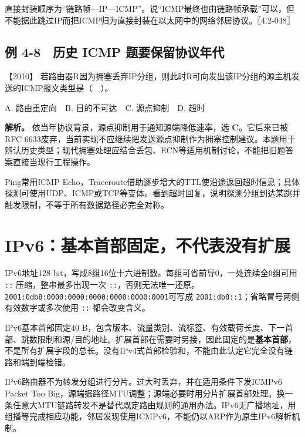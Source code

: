 直接封装顺序为``链路帧---IP---ICMP''。说``ICMP最终也由链路帧承载''可以，但不能据此跳过IP而把ICMP归为直接封装在以太网中的网络邻居协议。〖4.2-048〗

\subsection{例 4-8　历史 ICMP 题要保留协议年代}\label{cn-ex4-8}

\noindent{}【2010】 若路由器R因为拥塞丢弃IP分组，则此时R可向发出该IP分组的源主机发送的ICMP报文类型是（　）。

A. 路由重定向　B. 目的不可达　C. 源点抑制　D. 超时


\textbf{解析。} 依当年协议背景，源点抑制用于通知源端降低速率，选 \textbf{C}。它后来已被RFC 6633废弃，当前实现不应继续把发送源点抑制作为拥塞控制建议。本题用于辨认历史类型；现代拥塞处理应结合丢包、ECN等适用机制讨论，不能把旧题答案直接当现行工程操作。

Ping常用ICMP Echo，Traceroute借助逐步增大的TTL使沿途返回超时信息；具体探测可使用UDP、ICMP或TCP等变体。看到超时回复，说明探测分组到达某跳并触发限制，不等于所有数据路径必完全对称。

\section{IPv6：基本首部固定，不代表没有扩展}\label{cn-04-14}

IPv6地址128 bit，写成8组16位十六进制数。每组可省前导0，一处连续全0组可用 \texttt{::} 压缩，整串最多出现一次 \texttt{::}，否则无法唯一还原。\texttt{2001:0db8:0000:0000:0000:0000:0000:0001}可写成 \texttt{2001:db8::1}；省略冒号两侧有效数字或多次使用 \texttt{::} 都会改变含义。

IPv6基本首部固定40 B，包含版本、流量类别、流标签、有效载荷长度、下一首部、跳数限制和源/目的地址。扩展首部在需要时另接，因此固定的是\textbf{基本首部}，不是所有扩展字段的总长。没有IPv4式首部检验和，不能由此认定它完全没有链路和端到端检错。

IPv6路由器不为转发分组进行分片。过大时丢弃，并在适用条件下发ICMPv6 Packet Too Big，源端据路径MTU调整；源端必要时用分片扩展首部处理。换一条任意大MTU链路转发不是替代既定路由规则的通用办法。IPv6无广播地址，用组播等完成相应功能，邻居发现使用ICMPv6，不能仍以ARP作为原生IPv6解析机制。

